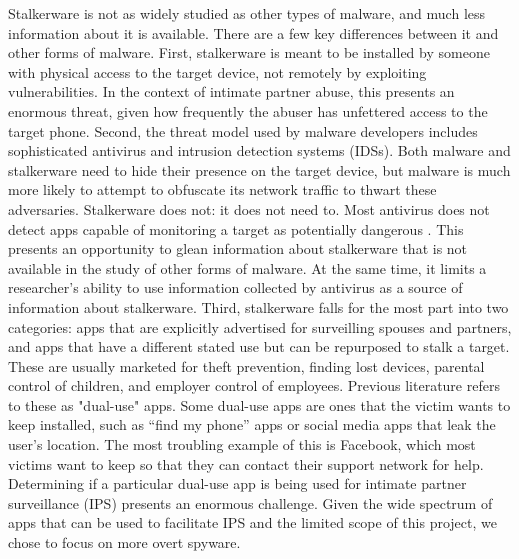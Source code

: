 \documentclass[acmtog]{acmart}
\begin{document}
Stalkerware is not as widely studied as other types of malware, and much less 
information about it is available. There are a few key differences between it 
and other forms of malware. First, stalkerware is meant to be installed 
by someone with physical access to the target device, not remotely by 
exploiting vulnerabilities. In the 
context of intimate partner abuse, this presents an enormous 
threat, given how frequently the abuser has unfettered access to the target 
phone. Second, the 
threat model used by malware developers includes sophisticated antivirus and 
intrusion detection systems (IDSs). Both malware and stalkerware need to hide 
their presence on the target device, but malware is much more likely to 
attempt to obfuscate its network traffic to thwart these adversaries. 
Stalkerware does not: it does not 
need to. Most antivirus does not detect apps capable of monitoring a target as 
potentially dangerous \cite{chatterjee_spyware_2018}. This presents an 
opportunity to glean information about stalkerware that is not available in the 
study of other forms of malware. At the same time, it limits a researcher's 
ability to use information collected by antivirus as a source of information 
about stalkerware. Third, stalkerware falls 
for the most part into two categories: apps that are explicitly advertised for 
surveilling spouses and partners, and apps that have a different stated use but 
can be repurposed to stalk a target. These are usually marketed for theft 
prevention, finding lost devices, parental control of children, and employer 
control of employees. Previous literature refers to these as "dual-use" 
apps\cite{chatterjee_spyware_2018}. Some dual-use apps are ones that the 
victim wants to keep installed, such as 
``find my phone'' apps or social media apps that leak the user's location. The 
most troubling example of this is Facebook, which most victims want to keep 
so that they can contact their support network for help.  Determining if a 
particular dual-use app is being used for intimate partner surveillance (IPS) 
presents an enormous challenge. Given the wide spectrum of apps that can be 
used to facilitate IPS and the limited scope of this project, we chose to focus 
on more overt spyware.
\end{document}
